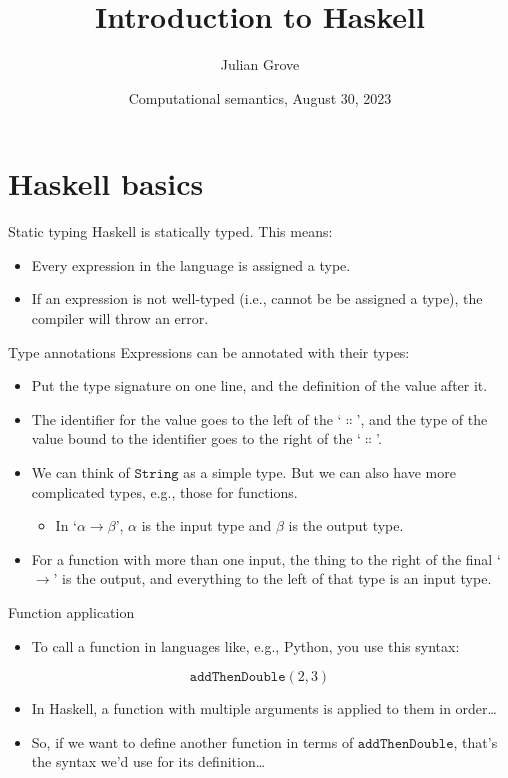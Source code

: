 \documentclass[presentation]{beamer}
\author{Julian Grove}
\date{Computational semantics, August 30, 2023}
\title{Introduction to Haskell}
\institute[University of Rochester]{University of Rochester}
\begin{document}
\maketitle

\section{Haskell basics}
\label{sec:orgd2abb1a}
\begin{frame}[label={sec:org7fe2071}]{Static typing}
Haskell is statically typed. This means:
\pause
\begin{itemize}[<+->]
\item Every expression in the language is assigned a type.
\item If an expression is not well-typed (i.e., cannot be be assigned a type),
the compiler will throw an error.
\end{itemize}
\end{frame}

\begin{frame}[label={sec:org4bf2ba3}]{Type annotations}
Expressions can be annotated with their types:
\pause
\begin{itemize}[<+->]
\item Put the type signature on one line, and the definition of the value after
it.
\item The identifier for the value goes to the left of the `\(∷\)', and the type of
the value bound to the identifier goes to the right of the `\(∷\)'.
\item We can think of \(\mathtt{String}\) as a simple type. \pause But
we can also have more complicated types, e.g., those for functions.
\pause
\begin{itemize}
\item In `\(α → β\)', \(α\) is the input type and \(β\) is the output type.
\end{itemize}
\item For a function with more than one input, the thing to the right of the
final `\(→\)' is the output, and everything to the left of that type is an
input type.
\end{itemize}
\end{frame}

\begin{frame}[label={sec:org8de05e7}]{Function application}
\pause
\begin{itemize}[<+->]
\item To call a function in languages like, e.g., Python, you use this syntax:
\end{itemize}
$$\mathtt{addThenDouble}(2, 3)$$
\begin{itemize}
\item In Haskell, a function with multiple arguments is applied to them in
order\ldots
\item So, if we want to define another function in terms of
\(\mathtt{addThenDouble}\), that's the syntax we'd use for its
definition\ldots
\end{itemize}
\end{frame}
\end{document}

